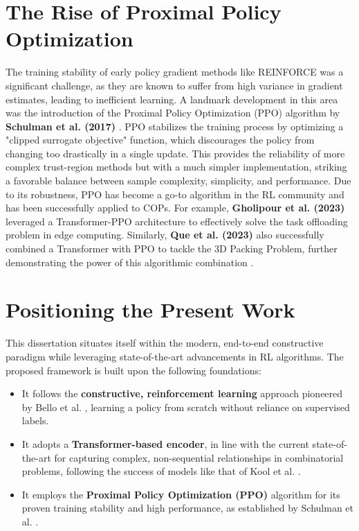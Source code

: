 \section{The Rise of Proximal Policy Optimization}
The training stability of early policy gradient methods like REINFORCE was a significant challenge, as they are known to suffer from high variance in gradient estimates, leading to inefficient learning.
A landmark development in this area was the introduction of the Proximal Policy Optimization (PPO) algorithm by \textbf{Schulman et al. (2017)} \cite{schulmanProximalPolicyOptimization2017}. PPO stabilizes the training process by optimizing a "clipped surrogate objective" function, which discourages the policy from changing too drastically in a single update.
This provides the reliability of more complex trust-region methods but with a much simpler implementation, striking a favorable balance between sample complexity, simplicity, and performance.
Due to its robustness, PPO has become a go-to algorithm in the RL community and has been successfully applied to COPs.
For example, \textbf{Gholipour et al. (2023)} \cite{gholipourTPTOTransformerPPOBased2023} leveraged a Transformer-PPO architecture to effectively solve the task offloading problem in edge computing. Similarly, \textbf{Que et al. (2023)} also successfully combined a Transformer with PPO to tackle the 3D Packing Problem, further demonstrating the power of this algorithmic combination \cite{queSolving3DPacking2023}.

\section{Positioning the Present Work}
This dissertation situates itself within the modern, end-to-end constructive paradigm while leveraging state-of-the-art advancements in RL algorithms.
The proposed framework is built upon the following foundations:
\begin{itemize}
    \item It follows the \textbf{constructive, reinforcement learning} approach pioneered by Bello et al. \cite{belloNeuralCombinatorialOptimization2017}, learning a policy from scratch without reliance on supervised labels.
    \item It adopts a \textbf{Transformer-based encoder}, in line with the current state-of-the-art for capturing complex, non-sequential relationships in combinatorial problems, following the success of models like that of Kool et al. \cite{koolAttentionLearnSolve2019a}.
    \item It employs the \textbf{Proximal Policy Optimization (PPO)} algorithm for its proven training stability and high performance, as established by Schulman et al. \cite{schulmanProximalPolicyOptimization2017}.
\end{itemize}

